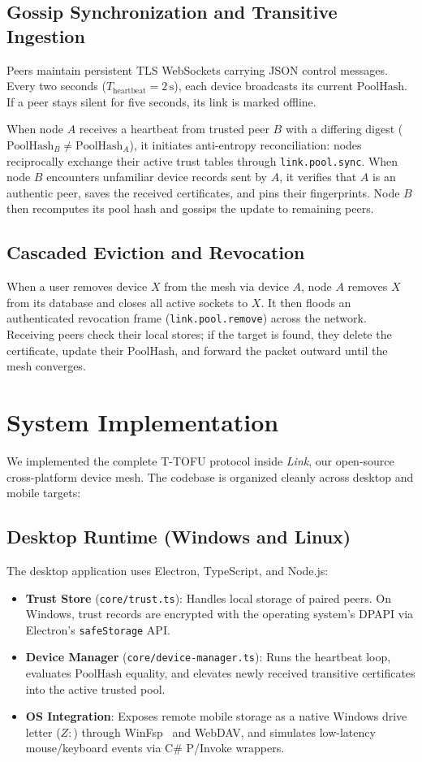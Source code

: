 \documentclass[conference]{IEEEtran}
\begin{document}
\subsection{Gossip Synchronization and Transitive Ingestion}
Peers maintain persistent TLS WebSockets carrying JSON control messages. Every two seconds ($T_{\text{heartbeat}} = 2\,\text{s}$), each device broadcasts its current $\text{PoolHash}$. If a peer stays silent for five seconds, its link is marked offline.

When node $A$ receives a heartbeat from trusted peer $B$ with a differing digest ($\text{PoolHash}_B \neq \text{PoolHash}_A$), it initiates anti-entropy reconciliation: nodes reciprocally exchange their active trust tables through \texttt{link.pool.sync}. When node $B$ encounters unfamiliar device records sent by $A$, it verifies that $A$ is an authentic peer, saves the received certificates, and pins their fingerprints. Node $B$ then recomputes its pool hash and gossips the update to remaining peers.

\subsection{Cascaded Eviction and Revocation}
When a user removes device $X$ from the mesh via device $A$, node $A$ removes $X$ from its database and closes all active sockets to $X$. It then floods an authenticated revocation frame (\texttt{link.pool.remove}) across the network. Receiving peers check their local stores; if the target is found, they delete the certificate, update their $\text{PoolHash}$, and forward the packet outward until the mesh converges.

\section{System Implementation}

We implemented the complete T-TOFU protocol inside \textit{Link}, our open-source cross-platform device mesh. The codebase is organized cleanly across desktop and mobile targets:

\subsection{Desktop Runtime (Windows and Linux)}
The desktop application uses Electron, TypeScript, and Node.js:
\begin{itemize}
    \item \textbf{Trust Store} (\texttt{core/trust.ts}): Handles local storage of paired peers. On Windows, trust records are encrypted with the operating system's DPAPI via Electron's \texttt{safeStorage} API.
    \item \textbf{Device Manager} (\texttt{core/device-manager.ts}): Runs the heartbeat loop, evaluates $\text{PoolHash}$ equality, and elevates newly received transitive certificates into the active trusted pool.
    \item \textbf{OS Integration}: Exposes remote mobile storage as a native Windows drive letter ($Z:$) through WinFsp~\cite{winfsp} and WebDAV, and simulates low-latency mouse/keyboard events via C\# P/Invoke wrappers.
\end{itemize}
\end{document}

